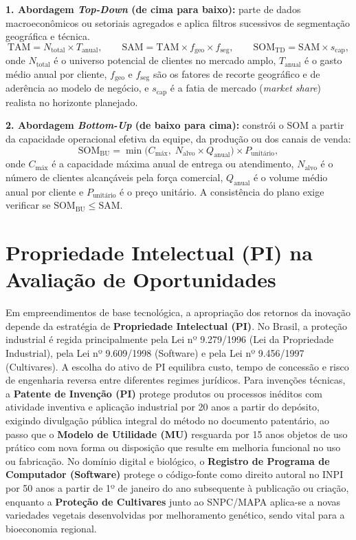 \begin{boxFormula}
  \textbf{1. Abordagem \textit{Top-Down} (de cima para baixo):} parte de dados macroeconômicos ou setoriais agregados e aplica filtros sucessivos de segmentação geográfica e técnica.
  \[
    \text{TAM} = N_{\text{total}} \times T_{\text{anual}}, \qquad
    \text{SAM} = \text{TAM} \times f_{\text{geo}} \times f_{\text{seg}}, \qquad
    \text{SOM}_{\text{TD}} = \text{SAM} \times s_{\text{cap}},
  \]
  onde $N_{\text{total}}$ é o universo potencial de clientes no mercado amplo, $T_{\text{anual}}$ é o gasto médio anual por cliente, $f_{\text{geo}}$ e $f_{\text{seg}}$ são os fatores de recorte geográfico e de aderência ao modelo de negócio, e $s_{\text{cap}}$ é a fatia de mercado (\textit{market share}) realista no horizonte planejado.

  \vspace{4pt}
  \textbf{2. Abordagem \textit{Bottom-Up} (de baixo para cima):} constrói o SOM a partir da capacidade operacional efetiva da equipe, da produção ou dos canais de venda:
  \[
    \text{SOM}_{\text{BU}} = \min\bigl(C_{\text{máx}}, \; N_{\text{alvo}} \times Q_{\text{anual}}\bigr) \times P_{\text{unitário}},
  \]
  onde $C_{\text{máx}}$ é a capacidade máxima anual de entrega ou atendimento, $N_{\text{alvo}}$ é o número de clientes alcançáveis pela força comercial, $Q_{\text{anual}}$ é o volume médio anual por cliente e $P_{\text{unitário}}$ é o preço unitário. A consistência do plano exige verificar se $\text{SOM}_{\text{BU}} \le \text{SAM}$.
\end{boxFormula}

\section{Propriedade Intelectual (PI) na Avaliação de Oportunidades}

Em empreendimentos de base tecnológica, a apropriação dos retornos da inovação depende da estratégia de \textbf{Propriedade Intelectual (PI)}. No Brasil, a proteção industrial é regida principalmente pela Lei nº 9.279/1996 (Lei da Propriedade Industrial), pela Lei nº 9.609/1998 (Software) e pela Lei nº 9.456/1997 (Cultivares). A escolha do ativo de PI equilibra custo, tempo de concessão e risco de engenharia reversa entre diferentes regimes jurídicos. Para invenções técnicas, a \textbf{Patente de Invenção (PI)} protege produtos ou processos inéditos com atividade inventiva e aplicação industrial por 20 anos a partir do depósito, exigindo divulgação pública integral do método no documento patentário, ao passo que o \textbf{Modelo de Utilidade (MU)} resguarda por 15 anos objetos de uso prático com nova forma ou disposição que resulte em melhoria funcional no uso ou fabricação. No domínio digital e biológico, o \textbf{Registro de Programa de Computador (Software)} protege o código-fonte como direito autoral no INPI por 50 anos a partir de 1º de janeiro do ano subsequente à publicação ou criação, enquanto a \textbf{Proteção de Cultivares} junto ao SNPC/MAPA aplica-se a novas variedades vegetais desenvolvidas por melhoramento genético, sendo vital para a bioeconomia regional.

